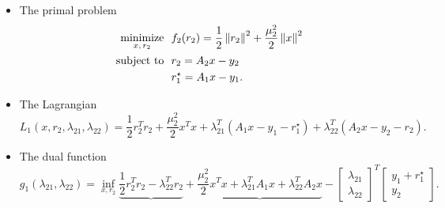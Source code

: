 \documentclass[12pt]{article}
\begin{document}
\begin{itemize}

\item The primal problem
  \begin{align*}
    \begin{split}
      \mathop{\mbox{minimize}}_{x, \, r_2} \ \  & f_2(r_2) = \frac{1}{2}\left\lVert r_2\right\rVert^2 + \frac{\mu_2^2}{2}\left\lVert x\right\rVert^2\\
      \mbox{subject to} \ \  & r_2 = A_2x - y_2 \\
      & r_1^{\star} = A_1x - y_1.
    \end{split}
  \end{align*}

\item The Lagrangian
  \[
  L_1(x,r_2,\lambda_{21},\lambda_{22}) = \frac{1}{2}r_2^Tr_2 + \frac{\mu_2^2}{2} x^Tx + \lambda_{21}^T(A_1x - y_1 - r_1^{\star}) + \lambda_{22}^T(A_2x - y_2 - r_2).
  \]

\item The dual function
%
\[
g_1(\lambda_{21}, \lambda_{22}) = \inf_{x,r_2} \underbrace{\frac{1}{2}r_2^Tr_2 - \lambda_{22}^Tr_2} + \underbrace{\frac{\mu_2^2}{2}x^Tx + \lambda_{21}^TA_1x + \lambda_{22}^TA_2x} -
\begin{bmatrix} \lambda_{21} \\ \lambda_{22} \end{bmatrix}^T \begin{bmatrix} y_1+r_1^{\star} \\ y_2 \end{bmatrix}.
\]


\end{itemize}
\end{document}
